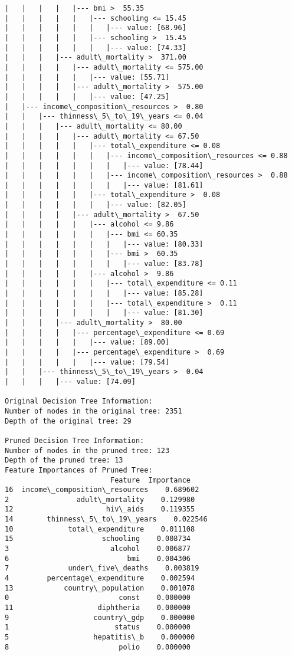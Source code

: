 \documentclass[11pt]{article}
\begin{document}
\begin{Verbatim}[commandchars=\\\{\}]
|   |   |   |   |--- bmi >  55.35
|   |   |   |   |   |--- schooling <= 15.45
|   |   |   |   |   |   |--- value: [68.96]
|   |   |   |   |   |--- schooling >  15.45
|   |   |   |   |   |   |--- value: [74.33]
|   |   |   |--- adult\_mortality >  371.00
|   |   |   |   |--- adult\_mortality <= 575.00
|   |   |   |   |   |--- value: [55.71]
|   |   |   |   |--- adult\_mortality >  575.00
|   |   |   |   |   |--- value: [47.25]
|   |--- income\_composition\_resources >  0.80
|   |   |--- thinness\_5\_to\_19\_years <= 0.04
|   |   |   |--- adult\_mortality <= 80.00
|   |   |   |   |--- adult\_mortality <= 67.50
|   |   |   |   |   |--- total\_expenditure <= 0.08
|   |   |   |   |   |   |--- income\_composition\_resources <= 0.88
|   |   |   |   |   |   |   |--- value: [78.44]
|   |   |   |   |   |   |--- income\_composition\_resources >  0.88
|   |   |   |   |   |   |   |--- value: [81.61]
|   |   |   |   |   |--- total\_expenditure >  0.08
|   |   |   |   |   |   |--- value: [82.05]
|   |   |   |   |--- adult\_mortality >  67.50
|   |   |   |   |   |--- alcohol <= 9.86
|   |   |   |   |   |   |--- bmi <= 60.35
|   |   |   |   |   |   |   |--- value: [80.33]
|   |   |   |   |   |   |--- bmi >  60.35
|   |   |   |   |   |   |   |--- value: [83.78]
|   |   |   |   |   |--- alcohol >  9.86
|   |   |   |   |   |   |--- total\_expenditure <= 0.11
|   |   |   |   |   |   |   |--- value: [85.28]
|   |   |   |   |   |   |--- total\_expenditure >  0.11
|   |   |   |   |   |   |   |--- value: [81.30]
|   |   |   |--- adult\_mortality >  80.00
|   |   |   |   |--- percentage\_expenditure <= 0.69
|   |   |   |   |   |--- value: [89.00]
|   |   |   |   |--- percentage\_expenditure >  0.69
|   |   |   |   |   |--- value: [79.54]
|   |   |--- thinness\_5\_to\_19\_years >  0.04
|   |   |   |--- value: [74.09]

Original Decision Tree Information:
Number of nodes in the original tree: 2351
Depth of the original tree: 29

Pruned Decision Tree Information:
Number of nodes in the pruned tree: 123
Depth of the pruned tree: 13
Feature Importances of Pruned Tree:
                         Feature  Importance
16  income\_composition\_resources    0.689602
2                adult\_mortality    0.129980
12                      hiv\_aids    0.119355
14        thinness\_5\_to\_19\_years    0.022546
10             total\_expenditure    0.011108
15                     schooling    0.008734
3                        alcohol    0.006877
6                            bmi    0.004306
7              under\_five\_deaths    0.003819
4         percentage\_expenditure    0.002594
13            country\_population    0.001078
0                          const    0.000000
11                    diphtheria    0.000000
9                    country\_gdp    0.000000
1                         status    0.000000
5                    hepatitis\_b    0.000000
8                          polio    0.000000
    \end{Verbatim}
\end{document}
